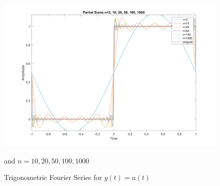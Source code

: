 \documentclass{article}
\begin{document}
\begin{figure}[!ht] 
    \centering
    \includegraphics[width = 15cm]{unitstep.png}
    \caption{Trigonometric Fourier Series for \(y(t) = u(t)\)} and \(n=10, 20, 50, 100, 1000\)
    \label{fig:unitstep}
\end{figure}
\end{document}
